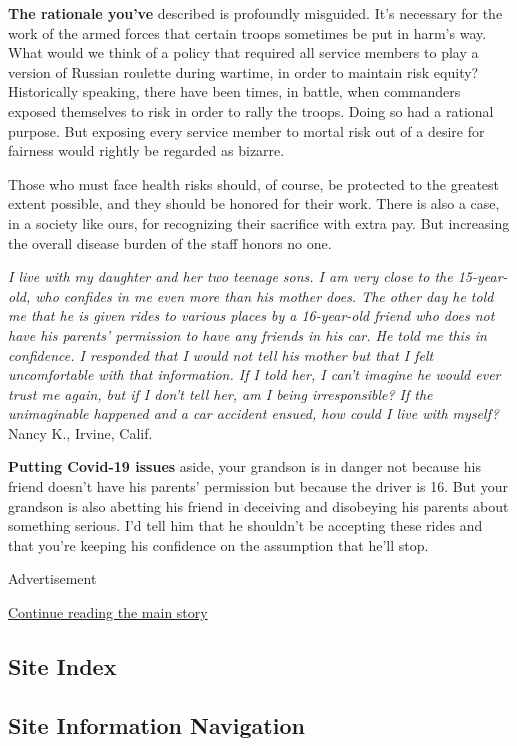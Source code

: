 \textbf{The rationale you've} described is profoundly misguided. It's
necessary for the work of the armed forces that certain troops sometimes
be put in harm's way. What would we think of a policy that required all
service members to play a version of Russian roulette during wartime, in
order to maintain risk equity? Historically speaking, there have been
times, in battle, when commanders exposed themselves to risk in order to
rally the troops. Doing so had a rational purpose. But exposing every
service member to mortal risk out of a desire for fairness would rightly
be regarded as bizarre.

Those who must face health risks should, of course, be protected to the
greatest extent possible, and they should be honored for their work.
There is also a case, in a society like ours, for recognizing their
sacrifice with extra pay. But increasing the overall disease burden of
the staff honors no one.

\emph{I live with my daughter and her two teenage sons. I am very close
to the 15-year-old, who confides in me even more than his mother does.
The other day he told me that he is given rides to various places by a
16-year-old friend who does not have his parents' permission to have any
friends in his car. He told me this in confidence. I responded that I
would not tell his mother but that I felt uncomfortable with that
information. If I told her, I can't imagine he would ever trust me
again, but if I don't tell her, am I being irresponsible? If the
unimaginable happened and a car accident ensued, how could I live with
myself?} Nancy K., Irvine, Calif.

\textbf{Putting Covid-19 issues} aside, your grandson is in danger not
because his friend doesn't have his parents' permission but because the
driver is 16. But your grandson is also abetting his friend in deceiving
and disobeying his parents about something serious. I'd tell him that he
shouldn't be accepting these rides and that you're keeping his
confidence on the assumption that he'll stop.

Advertisement

\protect\hyperlink{after-bottom}{Continue reading the main story}

\hypertarget{site-index}{%
\subsection{Site Index}\label{site-index}}

\hypertarget{site-information-navigation}{%
\subsection{Site Information
Navigation}\label{site-information-navigation}}

